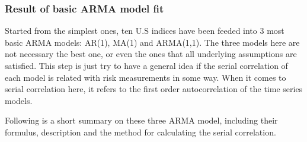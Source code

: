 \documentclass[11pt]{article}
\begin{document}
\subsubsection{Result of basic ARMA model fit}
Started from the simplest ones, ten U.S indices have been feeded into 3 most basic ARMA models: AR(1), MA(1) and ARMA(1,1). The three models here are not necessary the best one, or even the ones that all underlying assumptions are satisfied. This step is just try to have a general idea if the serial correlation of each model is related with risk measurements in some way. When it comes to serial correlation here, it refers to the first order autocorrelation of the time series models. 

Following is a short summary on these three ARMA model, including their formulus, description and the method for calculating the serial correlation.
\end{document}
